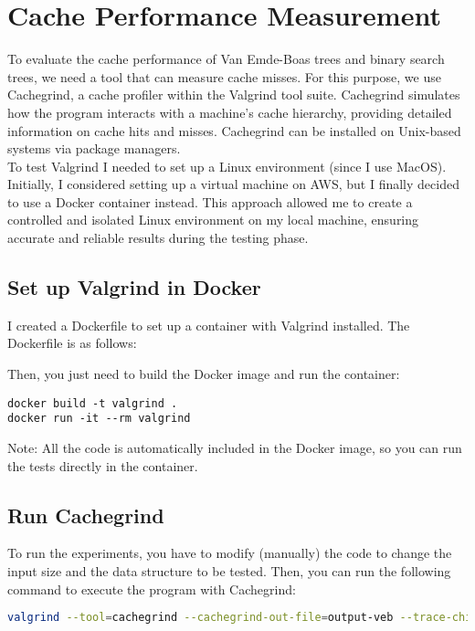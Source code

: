 \section{Cache Performance Measurement}

To evaluate the cache performance of Van Emde-Boas trees and binary search trees, we need a tool that can measure cache misses. For this purpose, we use Cachegrind, a cache profiler within the Valgrind tool suite. Cachegrind simulates how the program interacts with a machine's cache hierarchy, providing detailed information on cache hits and misses. Cachegrind can be installed on Unix-based systems via package managers.\\

To test Valgrind I needed to set up a Linux environment (since I use MacOS). Initially, I considered setting up a virtual machine on AWS, but I finally decided to use a Docker container instead. This approach allowed me to create a controlled and isolated Linux environment on my local machine, ensuring accurate and reliable results during the testing phase.

\subsection{Set up Valgrind in Docker}
I created a Dockerfile to set up a container with Valgrind installed. The Dockerfile is as follows:

Then, you just need to build the Docker image and run the container:
\begin{lstlisting}
docker build -t valgrind .
docker run -it --rm valgrind
\end{lstlisting}
Note: All the code is automatically included in the Docker image, so you can run the tests directly in the container.

\subsection{Run Cachegrind}
To run the experiments, you have to modify (manually) the code to change the input size and the data structure to be tested. Then, you can run the following command to execute the program with Cachegrind:
\begin{lstlisting}[language=bash]
valgrind --tool=cachegrind --cachegrind-out-file=output-veb --trace-children=yes /usr/bin/python3 ./van_emde_boas_tree.py
\end{lstlisting}

